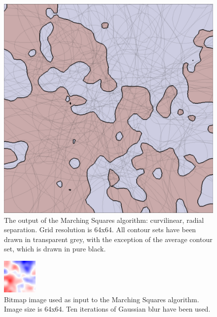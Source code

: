 \documentclass[12pt]{article}
\begin{document}
\begin{figure} 
\centering
  \includegraphics[width = 3 in]{1blur.png}
  \caption{The output of the Marching Squares algorithm: curvilinear, radial separation. 
Grid resolution is 64x64.
All contour sets have been drawn in transparent grey, with the exception of the average contour set, which is drawn in pure black.
}
\end{figure}







\begin{figure} 
\centering
  \includegraphics[width = 3 in]{image_avg_10blur.png}
  \caption{Bitmap image used as input to the Marching Squares algorithm.
Image size is 64x64.
Ten iterations of Gaussian blur have been used.
}
\end{figure}
	
\end{document}
